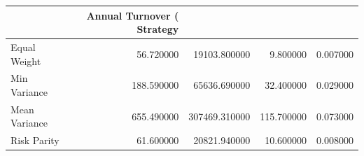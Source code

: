 \begin{tabular}{lrrrr}
\toprule
 & Annual Turnover (%
Strategy &  &  &  &  \\
\midrule
Equal Weight & 56.720000 & 19103.800000 & 9.800000 & 0.007000 \\
Min Variance & 188.590000 & 65636.690000 & 32.400000 & 0.029000 \\
Mean Variance & 655.490000 & 307469.310000 & 115.700000 & 0.073000 \\
Risk Parity & 61.600000 & 20821.940000 & 10.600000 & 0.008000 \\
\bottomrule
\end{tabular}
